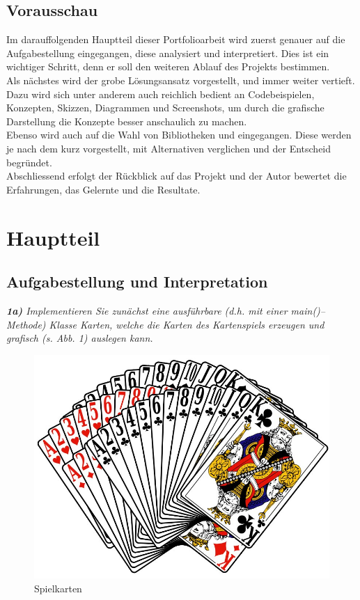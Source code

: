 \documentclass[a4paper,11pt]{article}
\begin{document}
\subsection{Vorausschau}

Im darauffolgenden Hauptteil dieser Portfolioarbeit wird zuerst genauer auf die Aufgabestellung eingegangen, diese analysiert und interpretiert. Dies ist ein wichtiger Schritt, denn er soll den weiteren Ablauf des Projekts bestimmen.\\

Als nächstes wird der grobe Lösungsansatz vorgestellt, und immer weiter vertieft. Dazu wird sich unter anderem auch reichlich bedient an Codebeispielen, Konzepten, Skizzen, Diagrammen und Screenshots, um durch die grafische Darstellung die Konzepte besser anschaulich zu machen.\\

Ebenso wird auch auf die Wahl von Bibliotheken und eingegangen. Diese werden je nach dem kurz vorgestellt, mit Alternativen verglichen und der Entscheid begründet.\\

Abschliessend erfolgt der Rückblick auf das Projekt und der Autor bewertet die Erfahrungen, das Gelernte und die Resultate.


\section{Hauptteil}

\subsection{Aufgabestellung und Interpretation}

\textit{\textbf{1a)} Implementieren Sie zunächst eine ausführbare (d.h. mit einer main()–Methode) Klasse Karten, welche die Karten des Kartenspiels erzeugen und grafisch (s. Abb. 1) auslegen kann.}

\begin{figure}[H]
    \centering
    \includegraphics[width=.45\textwidth]{media/spielkarten.jpg}
    \caption{Spielkarten}
\end{figure}
\end{document}
